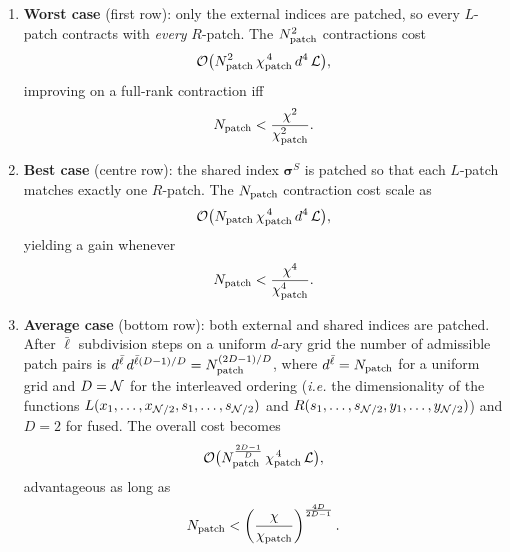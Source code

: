 \begingroup
\renewcommand{\labelenumi}{(\alph{enumi})}
\begin{enumerate}
\item \textbf{Worst case} (first row):  
      only the external indices are patched, so every \(L\)-patch contracts
      with \emph{every} \(R\)-patch.  
      The \(N_{\text{patch}}^{2}\) contractions cost
      \begin{equation}
        \label{eq:worsScaling}
        \mathcal{O}\bigl(
           N_{\text{patch}}^{2}\,
           \chi_{\text{patch}}^{\,4}\,d^{4}\,\mathcal L
        \bigr),
      \end{equation}
      improving on a full-rank contraction iff
      \begin{equation}
       N_{\text{patch}}<\frac{\chi^{2}}{\chi_{\text{patch}}^{2}}.
       \label{eq:worstBound}
      \end{equation}
      

\item \textbf{Best case} (centre row):  
      the shared index \(\boldsymbol{\sigma}^{S}\) is patched so that each
      \(L\)-patch matches exactly one \(R\)-patch.  
      The \(N_{\text{patch}} \) contraction cost scale as
      \begin{equation}
        \mathcal{O}\bigl(
          N_{\text{patch}} \,
          \chi_{\text{patch}}^{\,4}\,d^{4}\,\mathcal L
        \bigr),
      \end{equation}
      yielding a gain whenever
      \begin{equation}
       N_{\text{patch}}<\frac{\chi^{4}}{\chi_{\text{patch}}^{4}}.
       \label{eq:bestBound}
      \end{equation}

\item \textbf{Average case} (bottom row):  
      both external and shared indices are patched.  
      After \(\bar\ell\) subdivision steps on a uniform \(d\)-ary grid the
      number of admissible patch pairs is
      \(d^{\bar\ell}\,d^{\bar\ell( D-1)/D}
       =N_{\text{patch}}^{(2D-1)/D}\), where $d^{{\bar \ell}}= N_{\text{patch}}$ for a uniform grid and $D=\mathcal{N}$ for the interleaved ordering (\textit{i.e.} the dimensionality of the functions $L(x_1,\dots,x_{\mathcal{N}/2},s_1,\dots,s_{\mathcal{N}/2})$ and $R(s_1,\dots,s_{\mathcal{N}/2},y_1,\dots,y_{\mathcal{N}/2})$) and \(D=2\) for fused.
      The overall cost becomes
      \begin{equation}
        \mathcal{O}\bigl(
          N_{\text{patch}}^{\frac{2D-1}{D}}\,
          \chi_{\text{patch}}^{\,4}\,\mathcal L
        \bigr),
      \end{equation}
      advantageous as long as
      \begin{equation}
        N_{\text{patch}}<\left(\frac{\chi}{\chi_{\text{patch}}}\right)^{\frac{4D}{2D-1}}.
        \label{eq:averageBound}
      \end{equation}
\end{enumerate}
\endgroup

